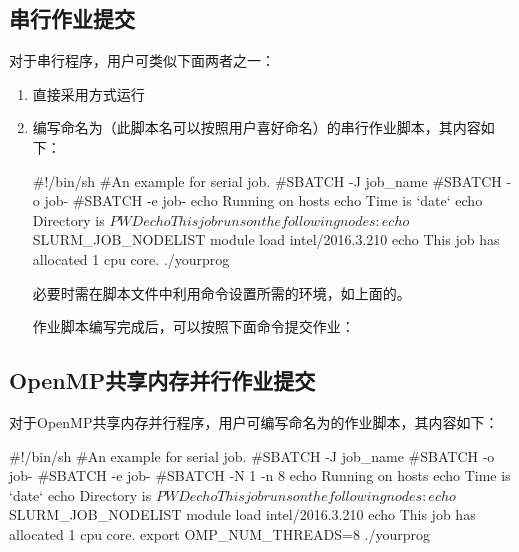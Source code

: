 \subsection{串行作业提交}
对于串行程序，用户可类似下面两者之一：
\begin{enumerate}
	\item 直接采用方式运行
	\item 编写命名为（此脚本名可以按照用户喜好命名）的串行作业脚本，其内容如下：
\begin{SH}
#!/bin/sh
#An example for serial job.
#SBATCH -J job_name
#SBATCH -o job-%
#SBATCH -e job-%
echo Running on hosts 
echo Time is `date`
echo Directory is $PWD
echo This job runs on the following nodes:
echo $SLURM_JOB_NODELIST
module load intel/2016.3.210
echo This job has allocated 1 cpu core.
./yourprog
\end{SH}
必要时需在脚本文件中利用命令设置所需的环境，如上面的。

作业脚本编写完成后，可以按照下面命令提交作业：

\end{enumerate}




\subsection{OpenMP共享内存并行作业提交}
对于OpenMP共享内存并行程序，用户可编写命名为的作业脚本，其内容如下：
\begin{SH}
#!/bin/sh
#An example for serial job.
#SBATCH -J job_name
#SBATCH -o job-%
#SBATCH -e job-%
#SBATCH -N 1 -n 8
echo Running on hosts 
echo Time is `date`
echo Directory is $PWD
echo This job runs on the following nodes:
echo $SLURM_JOB_NODELIST
module load intel/2016.3.210
echo This job has allocated 1 cpu core.
export OMP_NUM_THREADS=8
./yourprog
\end{SH}

